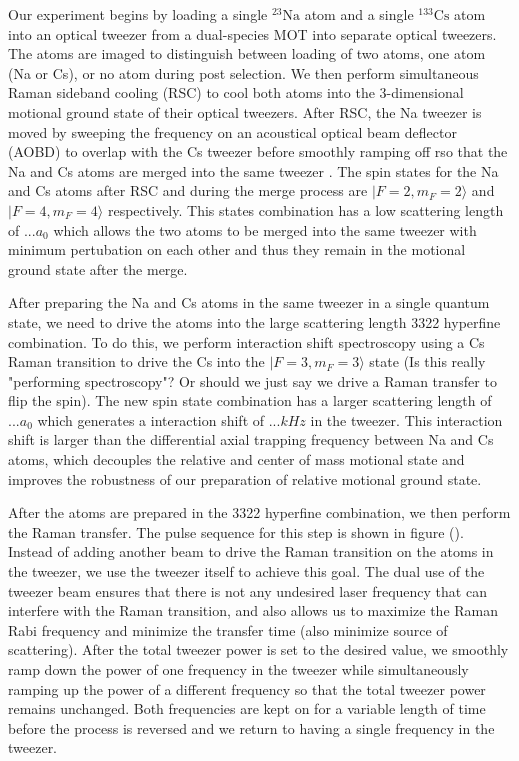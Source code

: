 \documentclass[aps,prl,twocolumn,groupedaddress]{revtex4-1}
\newcommand{\todo}[1]{}
\begin{document}
Our experiment begins by loading a single ${}^{23}\mathrm{Na}$ atom and a single ${}^{133}\mathrm{Cs}$ atom into an optical tweezer from a dual-species MOT\todo{cite na loading paper} into separate optical tweezers. The atoms are imaged to distinguish between loading of two atoms, one atom (Na or Cs), or no atom during post selection. We then perform simultaneous Raman sideband cooling (RSC) to cool both atoms into the 3-dimensional motional ground state of their optical tweezers. After RSC, the Na tweezer is moved by sweeping the frequency on an acoustical optical beam deflector (AOBD) to overlap with the Cs tweezer before smoothly ramping off rso that the Na and Cs atoms are merged into the same tweezer \todo{cite}. The spin states for the Na and Cs atoms after RSC and during the merge process are $|F=2,m_F=2\rangle$ and $|F=4,m_F=4\rangle$ respectively. This states combination has a low scattering length of $... a_0$ which allows the two atoms to be merged into the same tweezer with minimum pertubation on each other and thus they remain in the motional ground state after the merge.

After preparing the Na and Cs atoms in the same tweezer in a single quantum state, we need to drive the atoms into the large scattering length 3322 hyperfine combination. To do this, we perform interaction shift spectroscopy using a Cs Raman transition to drive the Cs into the $|F=3,m_F=3\rangle$ state (Is this really "performing spectroscopy"? Or should we just say we drive a Raman transfer to flip the spin). The new spin state combination has a larger scattering length of $... a_0$ which generates a interaction shift of $... kHz$ in the tweezer. This interaction shift is larger than the differential axial trapping frequency between Na and Cs atoms, which decouples the relative and center of mass motional state and improves the robustness of our preparation of relative motional ground state.


After the atoms are prepared in the 3322 hyperfine combination, we then perform the Raman transfer. The pulse sequence for this step is shown in figure (). Instead of adding another beam to drive the Raman transition on the atoms in the tweezer, we use the tweezer itself to achieve this goal. The dual use of the tweezer beam ensures that there is not any undesired laser frequency that can interfere with the Raman transition, and also allows us to maximize the Raman Rabi frequency and minimize the transfer time (also minimize source of scattering). After the total tweezer power is set to the desired value, we smoothly ramp down the power of one frequency in the tweezer while simultaneously ramping up the power of a different frequency so that the total tweezer power remains unchanged. Both frequencies are kept on for a variable length of time before the process is reversed and we return to having a single frequency in the tweezer.
\todo{clarify coprop of Raman beam?}
\end{document}
